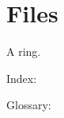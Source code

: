 \documentclass{article}
\begin{document}
\section{Files}
A ring.

Index: \provindex

Glossary: \provglossary
\printindex
\end{document}
